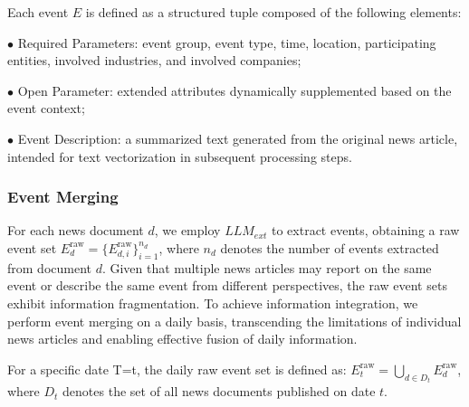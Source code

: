 \documentclass[sigconf, nonacm]{acmart} %
\begin{document}
Each event $E$ is defined as a structured tuple composed of the following elements:

$\bullet$  Required Parameters: event group, event type, time, location, participating entities, involved industries, and involved companies;

$\bullet$  Open Parameter: extended attributes dynamically supplemented based on the event context;

$\bullet$  Event Description: a summarized text generated from the original news article, intended for text vectorization in subsequent processing steps.

\subsubsection{Event Merging}
\label{sec:subsubsection}
For each news document $d$, we employ $LLM_{ext}$ to extract events, obtaining a raw event set 
$E^{\text{raw}}_d = \{E^{\text{raw}}_{d,i}\}_{i=1}^{n_d}$, where $n_d$ denotes the number of events extracted from document $d$.
Given that multiple news articles may report on the same event or describe the same event from different perspectives, the raw event sets exhibit information fragmentation. To achieve information integration, we perform event merging on a daily basis, transcending the limitations of individual news articles and enabling effective fusion of daily information.

For a specific date {T=t}, the daily raw event set is defined as:
${E^{\text{raw}}_t = \bigcup_{d \in D_t} E^{\text{raw}}_d}$, 
where $D_t$ denotes the set of all news documents published on date $t$.
\end{document}
